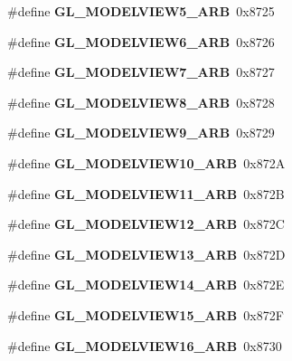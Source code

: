 \begin{DoxyCompactItemize}
\item 
\#define {\bfseries G\+L\+\_\+\+M\+O\+D\+E\+L\+V\+I\+E\+W5\+\_\+\+A\+R\+B}~0x8725\label{_s_d_l__opengl_8h_ae64453e3222c8b6d37dec88492552ae4}

\item 
\#define {\bfseries G\+L\+\_\+\+M\+O\+D\+E\+L\+V\+I\+E\+W6\+\_\+\+A\+R\+B}~0x8726\label{_s_d_l__opengl_8h_a98cb5de6fb7bcde330f58a9a0cbcf701}

\item 
\#define {\bfseries G\+L\+\_\+\+M\+O\+D\+E\+L\+V\+I\+E\+W7\+\_\+\+A\+R\+B}~0x8727\label{_s_d_l__opengl_8h_a917edab383c3fa1c955d31fa995cc222}

\item 
\#define {\bfseries G\+L\+\_\+\+M\+O\+D\+E\+L\+V\+I\+E\+W8\+\_\+\+A\+R\+B}~0x8728\label{_s_d_l__opengl_8h_ac19ed02429a8b229877da4d1db521e2a}

\item 
\#define {\bfseries G\+L\+\_\+\+M\+O\+D\+E\+L\+V\+I\+E\+W9\+\_\+\+A\+R\+B}~0x8729\label{_s_d_l__opengl_8h_a0d43d460af5a70905259b64d6a4161c2}

\item 
\#define {\bfseries G\+L\+\_\+\+M\+O\+D\+E\+L\+V\+I\+E\+W10\+\_\+\+A\+R\+B}~0x872\+A\label{_s_d_l__opengl_8h_a72301c30dfc55bbf2e09efb1afd5b981}

\item 
\#define {\bfseries G\+L\+\_\+\+M\+O\+D\+E\+L\+V\+I\+E\+W11\+\_\+\+A\+R\+B}~0x872\+B\label{_s_d_l__opengl_8h_aed5e6112a973119f1371cd49ac59441a}

\item 
\#define {\bfseries G\+L\+\_\+\+M\+O\+D\+E\+L\+V\+I\+E\+W12\+\_\+\+A\+R\+B}~0x872\+C\label{_s_d_l__opengl_8h_ac4792a2be2daa154baccec97f7cd2d27}

\item 
\#define {\bfseries G\+L\+\_\+\+M\+O\+D\+E\+L\+V\+I\+E\+W13\+\_\+\+A\+R\+B}~0x872\+D\label{_s_d_l__opengl_8h_a9d5f45788d300eb39e7bbdb484b12d55}

\item 
\#define {\bfseries G\+L\+\_\+\+M\+O\+D\+E\+L\+V\+I\+E\+W14\+\_\+\+A\+R\+B}~0x872\+E\label{_s_d_l__opengl_8h_ad2524ece2a56056b605ecf35920f6332}

\item 
\#define {\bfseries G\+L\+\_\+\+M\+O\+D\+E\+L\+V\+I\+E\+W15\+\_\+\+A\+R\+B}~0x872\+F\label{_s_d_l__opengl_8h_a84c9aabf79ad7516e2e4f5e1d7435a03}

\item 
\#define {\bfseries G\+L\+\_\+\+M\+O\+D\+E\+L\+V\+I\+E\+W16\+\_\+\+A\+R\+B}~0x8730\label{_s_d_l__opengl_8h_af1ecbd1d1808edf1053d73006e0bd388}


\end{DoxyCompactItemize}
